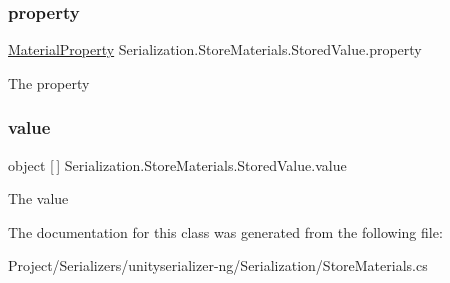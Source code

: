 \subsubsection{\texorpdfstring{property}{property}}
{\footnotesize\ttfamily \hyperlink{class_serialization_1_1_store_materials_1_1_material_property}{Material\+Property} Serialization.\+Store\+Materials.\+Stored\+Value.\+property}



The property 

\mbox{\label{class_serialization_1_1_store_materials_1_1_stored_value_aa483eb4367f2294ab1d112f00e26032a}} 
\subsubsection{\texorpdfstring{value}{value}}
{\footnotesize\ttfamily object \mbox{[}$\,$\mbox{]} Serialization.\+Store\+Materials.\+Stored\+Value.\+value}



The value 



The documentation for this class was generated from the following file\+:\begin{DoxyCompactItemize}
\item 
Project/\+Serializers/unityserializer-\/ng/\+Serialization/Store\+Materials.\+cs\end{DoxyCompactItemize}
